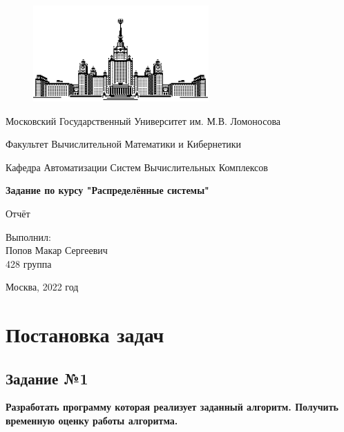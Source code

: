 \documentclass[a4paper]{article}
\begin{document}
\begin{titlepage}
    \thispagestyle{empty}

    \begin{center}
        \begin{figure}[htbp]
            \centering
            \includegraphics[width=0.6\textwidth]{pics/msu.png}
        \end{figure}

        Московский Государственный Университет им. М.В. Ломоносова

        Факультет Вычислительной Математики и Кибернетики

        Кафедра Автоматизации Систем Вычислительных Комплексов

        \vfill
        \textbf{\huge Задание по курсу "Распределённые системы"}

        {\huge Отчёт}
    \end{center}

    \vfill
    \begin{flushright}
        {\large Выполнил:\\Попов Макар Сергеевич\\428 группа\\}
    \end{flushright}

    \centerline{Москва, 2022 год}

\end{titlepage}
\linespread{1.7}
\setcounter{page}{2}
\large

\tableofcontents
\newpage

\section{Постановка задач}

\subsection{Задание №1}
\textbf{Разработать программу которая реализует заданный алгоритм. Получить временную оценку работы алгоритма.}
\end{document}
